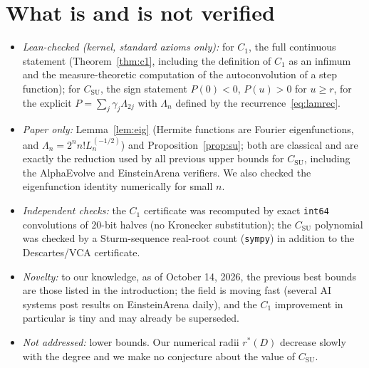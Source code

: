 \documentclass[11pt]{article}
\numberwithin{equation}{section}
\theoremstyle{definition}
\theoremstyle{remark}
\begin{document}
\section{What is and is not verified}\label{sec:limits}
\begin{itemize}
\item \emph{Lean-checked (kernel, standard axioms only):} for $C_1$, the full continuous statement
  (Theorem~\ref{thm:c1}, including the definition of $C_1$ as an infimum and the measure-theoretic
  computation of the autoconvolution of a step function); for $C_{\mathrm{SU}}$, the sign statement
  $P(0)<0$, $P(u)>0$ for $u\ge r$, for the explicit $P=\sum_j\gamma_j\Lambda_{2j}$ with $\Lambda_n$ defined by
  the recurrence~\eqref{eq:lamrec}.
\item \emph{Paper only:} Lemma~\ref{lem:eig} (Hermite functions are Fourier eigenfunctions, and
  $\Lambda_n=2^nn!L_n^{(-1/2)}$) and Proposition~\ref{prop:su}; both are classical and are exactly the
  reduction used by all previous upper bounds for $C_{\mathrm{SU}}$, including the AlphaEvolve and
  EinsteinArena verifiers. We also checked the eigenfunction identity numerically for small $n$.
\item \emph{Independent checks:} the $C_1$ certificate was recomputed by exact \texttt{int64}
  convolutions of $20$-bit halves (no Kronecker substitution); the $C_{\mathrm{SU}}$ polynomial was
  checked by a Sturm-sequence real-root count (\texttt{sympy}) in addition to the Descartes/VCA
  certificate.
\item \emph{Novelty:} to our knowledge, as of October 14, 2026, the previous best bounds are those
  listed in the introduction; the field is moving fast (several AI systems post results on
  EinsteinArena daily), and the $C_1$ improvement in particular is tiny and may already be superseded.
\item \emph{Not addressed:} lower bounds. Our numerical radii $r^*(D)$ decrease slowly with the degree
  and we make no conjecture about the value of $C_{\mathrm{SU}}$.
\end{itemize}



\end{document}
